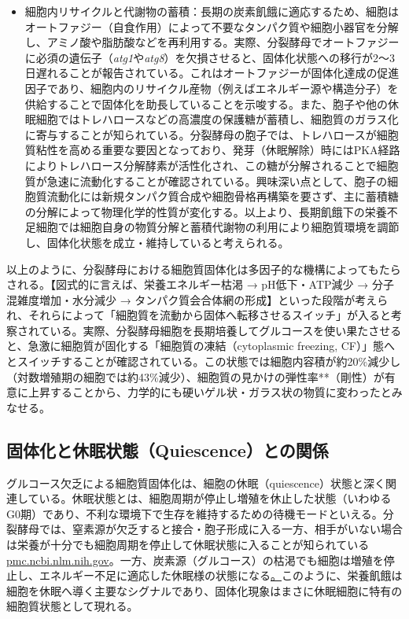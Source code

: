 \begin{itemize}
    \item 細胞内リサイクルと代謝物の蓄積：長期の炭素飢餓に適応するため、細胞はオートファジー（自食作用）によって不要なタンパク質や細胞小器官を分解し、アミノ酸や脂肪酸などを再利用する。実際、分裂酵母でオートファジーに必須の遺伝子（\textit{atg1}や\textit{atg8}）を欠損させると、固体化状態への移行が2〜3日遅れることが報告されている。これはオートファジーが固体化達成の促進因子であり、細胞内のリサイクル産物（例えばエネルギー源や構造分子）を供給することで固体化を助長していることを示唆する。また、胞子や他の休眠細胞ではトレハロースなどの高濃度の保護糖が蓄積し、細胞質のガラス化に寄与することが知られている。分裂酵母の胞子では、トレハロースが細胞質粘性を高める重要な要因となっており、発芽（休眠解除）時にはPKA経路によりトレハロース分解酵素が活性化され、この糖が分解されることで細胞質が急速に流動化することが確認されている。興味深い点として、胞子の細胞質流動化には新規タンパク質合成や細胞骨格再構築を要さず、主に蓄積糖の分解によって物理化学的性質が変化する。以上より、長期飢餓下の栄養不足細胞では細胞自身の物質分解と蓄積代謝物の利用により細胞質環境を調節し、固体化状態を成立・維持していると考えられる。
\end{itemize}
以上のように、分裂酵母における細胞質固体化は多因子的な機構によってもたらされる。【図式的に言えば、栄養エネルギー枯渇 → pH低下・ATP減少 → 分子混雑度増加・水分減少 → タンパク質会合体網の形成】といった段階が考えられ、それらによって「細胞質を流動から固体へ転移させるスイッチ」が入ると考察されている。実際、分裂酵母細胞を長期培養してグルコースを使い果たさせると、急激に細胞質が固化する「細胞質の凍結（cytoplasmic freezing, CF）」態へとスイッチすることが確認されている。この状態では細胞内容積が約20\%減少し（対数増殖期の細胞では約43\%減少）、細胞質の見かけの弾性率**（剛性）が有意に上昇することから、力学的にも硬いゲル状・ガラス状の物質に変わったとみなせる。

\subsection{固体化と休眠状態（Quiescence）との関係}
グルコース欠乏による細胞質固体化は、細胞の休眠（quiescence）状態と深く関連している。休眠状態とは、細胞周期が停止し増殖を休止した状態（いわゆるG0期）であり、不利な環境下で生存を維持するための待機モードといえる。分裂酵母では、窒素源が欠乏すると接合・胞子形成に入る一方、相手がいない場合は栄養が十分でも細胞周期を停止して休眠状態に入ることが知られている\href{https://pmc.ncbi.nlm.nih.gov/articles/PMC6857596/\#:~:text=When\%20nutrients\%20become\%20growth\%20limiting,yeast\%20cells\%20that\%20have\%20slowly}{pmc.ncbi.nlm.nih.gov}。一方、炭素源（グルコース）の枯渇でも細胞は増殖を停止し、エネルギー不足に適応した休眠様の状態になる\href{https://pmc.ncbi.nlm.nih.gov/articles/PMC3123465/\#:~:text=stochastic\%2C\%20accompanied\%20by\%20a\%20curious,choline\%29\%2C\%20which\%20increased\%20or}。このように、栄養飢餓は細胞を休眠へ導く主要なシグナルであり、固体化現象はまさに休眠細胞に特有の細胞質状態として現れる。

